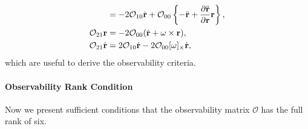 \begin{align}
& = -2\mathcal{O}_{10}\dot{\mathbf{r}} +\mathcal{O}_{00}\left\{ -\ddot {\mathbf{r}} +\frac{\partial \ddot{\mathbf{r}}}{\partial \mathbf{r}}\mathbf{r} \right\},\label{eqn:O20r}\\
\mathcal{O}_{21}\mathbf{r} & = -2\mathcal{O}_{00} (\dot{\mathbf{r}}+\omega\times\mathbf{r}),\label{eqn:O21r}\\
\mathcal{O}_{21}\dot{\mathbf{r}} & = 2\mathcal{O}_{10} \dot{\mathbf{r}}
- 2 \mathcal{O}_{00}[\omega]_\times\dot{\mathbf{r}},\label{eqn:O21rdot}
\end{align}
which are useful to derive the observability criteria. 

\paragraph{Observability Rank Condition}



Now we present sufficient conditions that the observability matrix $\mathcal{O}$ has the full rank of six. 

